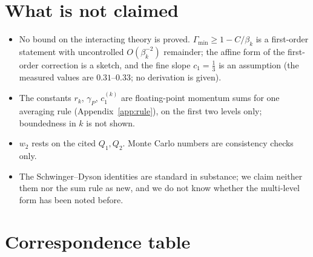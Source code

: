 \documentclass[11pt,a4paper]{article}
\theoremstyle{definition}
\theoremstyle{remark}
\begin{document}
\section{What is not claimed}\label{sec:notclaimed}
\begin{itemize}[leftmargin=1.5em,itemsep=1pt,topsep=2pt]
\item No bound on the interacting theory is proved. $\Gamma_{\min}\ge1-C/\beta_k$ is a first-order statement with uncontrolled $O(\beta_k^{-2})$ remainder; the affine form of the first-order correction is a sketch, and the fine slope $c_1=\frac13$ is an assumption (the measured values are $0.31$--$0.33$; no derivation is given).
\item The constants $r_k$, $\gamma_P$, $c_1^{(k)}$ are floating-point momentum sums for one averaging rule (Appendix~\ref{app:rule}), on the first two levels only; boundedness in $k$ is not shown.
\item $w_2$ rests on the cited $Q_1,Q_2$. Monte Carlo numbers are consistency checks only.
\item The Schwinger--Dyson identities are standard in substance; we claim neither them nor the sum rule as new, and we do not know whether the multi-level form has been noted before.
\end{itemize}

\section{Correspondence table}\label{sec:corr}
\end{document}
